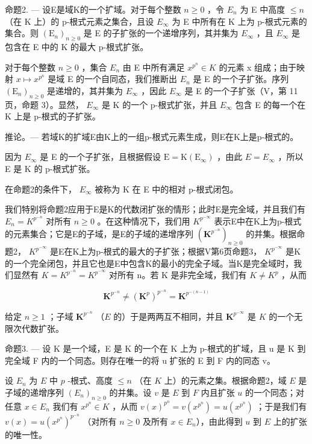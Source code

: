 命题2. --- 设E是域K的一个扩域。对于每个整数 \(n \geqslant 0\) ，令 \(E_{n}\) 为 E 中高度 \(\leqslant n\) （在 K 上）的 p-根式元素之集合，且设 \(E_{\infty}\) 为 E 中所有在 K 上为 p-根式元素的集合。则 \((\mathrm{E}_{n})_{n \geqslant 0}\) 是 E 的子扩张的一个递增序列，其并集为 \(E_{\infty}\) ，且 \(E_{\infty}\) 是包含在 E 中的 K 的最大 p-根式扩张。

对于每个整数 \(n \geqslant 0\) ，集合 \(E_{n}\) 由 E 中所有满足 \(x^{p^{n}} \in K\) 的元素 x 组成；由于映射 \(x \mapsto x^{p^{n}}\) 是域 E 的一个自同态，我们推断出 \(E_{n}\) 是 E 的一个子扩张。序列 \((\mathrm{E}_{n})_{n \geqslant 0}\) 是递增的，其并集为 \(E_{\infty}\) ，因此 \(E_{\infty}\) 是 E 的一个子扩张（V，第 11 页，命题 3）。显然， \(E_{\infty}\) 是 K 的一个 p-根式扩张，并且 \(E_{\infty}\) 包含 E 的每一个在 K 上是 p-根式的子扩张。

推论。--- 若域K的扩域E由K上的一组p-根式元素生成，则E在K上是p-根式的。

因为 \(E_{\infty}\) 是 E 的一个子扩张，且根据假设 \(\mathrm{E} = \mathrm{K}(\mathrm{E}_{\infty})\) ，由此 \(E = E_{\infty}\) ，所以 E 是 K 的 p-根式扩张。

在命题2的条件下， \(E_{\infty}\) 被称为 K 在 E 中的相对 p-根式闭包。

我们特别将命题2应用于E是K的代数闭扩张的情形；此时E是完全域，并且我们有 \(E_{n} = K^{p^{-n}}\) 对所有 \(n \geqslant 0\) 。在这种情况下，我们用 \(K^{p^{-\infty}}\) 表示E中在K上为p-根式的元素集合；它是E的子域，是E的子域的递增序列 \((\mathbf{K}^{p^{-n}})_{n \geqslant 0}\) 的并集。根据命题2， \(K^{p^{-\infty}}\) 是E在K上为p-根式的最大的子扩张；根据V第6页命题3， \(K^{p^{-\infty}}\) 是K的一个完全闭包，并且它也是E中包含K的最小的完全子域。当K是完全域时，我们显然有 \(K = K^{p^{-n}} = K^{p^{-\infty}}\) 对所有 n。若 K 是非完全域，我们有 \(K \neq K^{p}\) ，从而

\[
\mathbf {K} ^ {p ^ {- n}} \neq (\mathbf {K} ^ {p}) ^ {p ^ {- n}} = \mathbf {K} ^ {p ^ {- (n - 1)}}
\]

给定 \(n \geqslant 1\) ；子域 \(\mathbf{K}^{p^{-n}}\) （\(E\) 的）于是两两互不相同，并且 \(\mathbf{K}^{p^{-\infty}}\) 是 \(K\) 的一个无限次代数扩张。

命题3. --- 设 K 是一个域，E 是 K 的一个在 K 上为 p-根式的扩域，且 u 是 K 到完全域 F 内的一个同态。则存在唯一的将 u 扩张的 E 到 F 内的同态 v。

设 \(E_n\) 为 \(E\) 中 \(p\) -根式、高度 \(\leqslant n\) （在 \(K\) 上）的元素之集。根据命题2，域 \(E\) 是子域的递增序列 \((E_n)_{n \geqslant 0}\) 的并集。设 \(v\) 是 \(E\) 到 \(F\) 内且扩张 \(u\) 的一个同态；对任意 \(x \in E_n\) 我们有 \(x^{p^n} \in K\) ，从而 \(v(x)^{p^n} = v(x^{p^n}) = u(x^{p^n})\) ；于是我们有 \(v(x) = u(x^{p^n})^{p^{-n}}\) （对所有 \(n \geqslant 0\) 及所有 \(x \in E_n\)），由此得到 \(u\) 到 \(E\) 上的扩张的唯一性。

